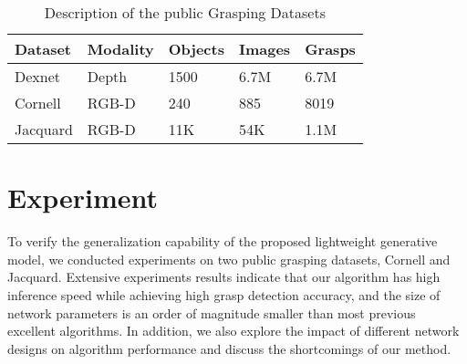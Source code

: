 \documentclass[journal]{IEEEtran}
\begin{document}
\begin{table}[htbp]
	\caption{Description of the public Grasping Datasets}	
	\begin{center}
		\begin{tabular}{p{30pt}|p{30pt}|p{30pt}|p{25pt}|p{25pt}}
			\hline
			\textbf{Dataset}&{\textbf{Modality}}&{\textbf{Objects}} &{\textbf{Images}} &{\textbf{Grasps}} \\
			\hline
			Dexnet& Depth & 1500 &  6.7M & 6.7M\\
			Cornell& RGB-D & 240 &  885 & 8019\\
			Jacquard& RGB-D & 11K &  54K & 1.1M\\


\hline
		\end{tabular}
	\end{center}
	\label{tab:datset}
\end{table}

\section{Experiment}
To verify the generalization capability of the proposed lightweight generative model, we conducted experiments on two public grasping datasets, Cornell and Jacquard. Extensive experiments results indicate that our algorithm has high inference speed while achieving high grasp detection accuracy, and the size of network parameters is an  order of magnitude smaller than most previous excellent algorithms. In addition, we also explore the impact of different network designs on algorithm performance and discuss the shortcomings of our method.
\end{document}
